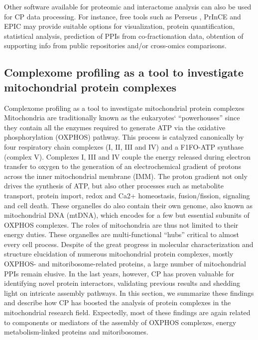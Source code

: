 Other software available for proteomic and interactome analysis can also be used for CP data processing. For instance, free tools such as Perseus \cite{Tyanova_2016b}, PrInCE \cite{Stacey_2017} and EPIC \cite{Hu_2019} may provide suitable options for visualization, protein quantification, statistical analysis, prediction of PPIs from co-fractionation data, obtention of supporting info from public repositories and/or cross-omics comparisons.

\subsection*{Complexome profiling as a tool to investigate mitochondrial protein complexes} \label{ssec:CP_MS_ssec3}
Complexome profiling as a tool to investigate mitochondrial protein complexes
Mitochondria are traditionally known as the eukaryotes` “powerhouses” since they contain all the enzymes required to generate ATP via the oxidative phosphorylation (OXPHOS) pathway. This process is catalyzed canonically by four respiratory chain complexes (I, II, III and IV) and a F1FO-ATP synthase (complex V). Complexes I, III and IV couple the energy released during electron transfer to oxygen to the generation of an electrochemical gradient of protons across the inner mitochondrial membrane (IMM). The proton gradient not only drives the synthesis of ATP, but also other processes such as metabolite transport, protein import, redox and Ca2+ homeostasis, fusion/fission, signaling and cell death. These organelles do also contain their own genome, also known as mitochondrial DNA (mtDNA), which encodes for a few but essential subunits of OXPHOS complexes. The roles of mitochondria are thus not limited to their energy duties. These organelles are multi-functional “hubs” critical to almost every cell process.
Despite of the great progress in molecular characterization and structure elucidation of numerous mitochondrial protein complexes, mostly OXPHOS- and mitoribosome-related proteins, a large number of mitochondrial PPIs remain elusive. In the last years, however, CP has proven valuable for identifying novel protein interactors, validating previous results and shedding light on intricate assembly pathways. In this section, we summarize these findings and describe how CP has boosted the analysis of protein complexes in the mitochondrial research field. Expectedly, most of these findings are again related to components or mediators of the assembly of OXPHOS complexes, energy metabolism-linked proteins and mitoribosomes.\\
